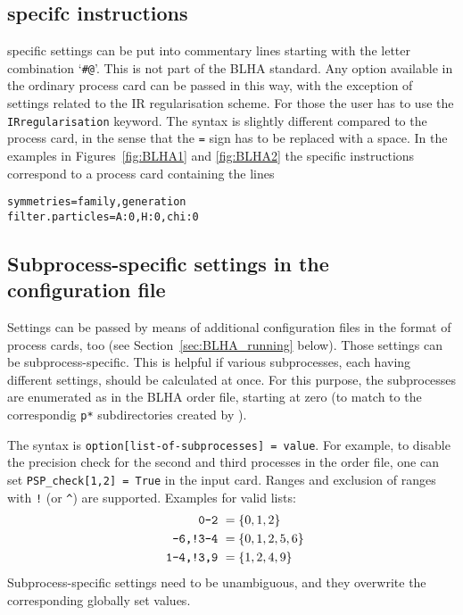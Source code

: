 %
%
%



%
%
%

\subsection{\gosam specifc instructions}\label{sec:hashat_instructions}
\gosam specific settings can be put into commentary lines starting with the letter combination `\texttt{\#@}'. This is not part of the BLHA standard. Any option available in the ordinary \gosam process card can be passed in this way, with the exception of settings related to the IR regularisation scheme. For those the user has to use the \texttt{IRregularisation} keyword. The syntax is slightly different compared to the process card, in the sense that the \texttt{=} sign has to be replaced with a space. In the examples in Figures~\ref{fig:BLHA1} and \ref{fig:BLHA2} the specific instructions correspond to a process card containing the lines
\begin{lstlisting}[gobble=0,style=in]
symmetries=family,generation
filter.particles=A:0,H:0,chi:0
\end{lstlisting}


\subsection{Subprocess-specific settings in the \gosam configuration file}
Settings can be passed by means of additional configuration files in the format of \gosam process cards, too (see Section~\ref{sec:BLHA_running} below). Those settings can be subprocess-specific. This is helpful if various subprocesses, each having different settings, should be calculated at once. For this purpose, the subprocesses are enumerated as in the BLHA order file, starting at zero (to match to the correspondig \texttt{p*} subdirectories created by \gosam{}).


The syntax is \lstinline[style=sh]|option[list-of-subprocesses] = value|. For example, to disable the precision check for the second and third processes in the order file, one can set \lstinline[style=sh]|PSP_check[1,2] = True| in the input card. Ranges and exclusion of ranges with \texttt{!} (or \texttt{\^}) are supported. Examples for valid lists:
\begin{align*}
    \text{\texttt{0-2}         }     &= \{0,1,2\} \\
    \text{\texttt{-6,!3-4}         }  &   = \{0,1,2,5,6\} \\
    \text{\texttt{ 1-4,!3,9}       }   &   = \{1,2,4,9\}
\end{align*}
Subprocess-specific settings need to be unambiguous, and they overwrite the corresponding globally set values.

